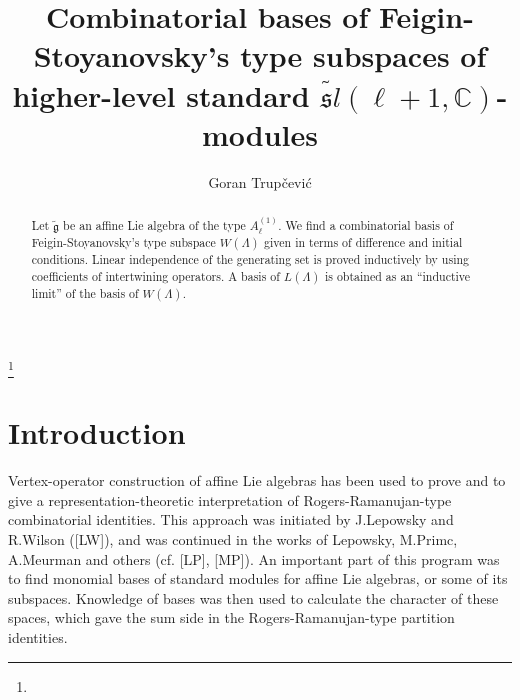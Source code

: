 \documentclass[a4paper, 10pt,oneside]{amsart}
\begin{document}
\author{Goran Trup\v{c}evi\'{c}}
\title{Combinatorial bases of Feigin-Stoyanovsky's type subspaces of higher-level standard $\tilde{{\mathfrak sl}}(\ell+1,{{\mathbb C}})$-modules}
\address{Department of Mathematics, University of Zagreb, Bijeni\v cka 30, Zagreb, Croatia}
\curraddr{}
\thanks{}
\keywords{}
\date{}
\dedicatory{}

\begin{abstract}

Let $\tilde{\mathfrak g}$ be an affine Lie algebra of the type
$A_\ell^{(1)}$.
We find a combinatorial basis of Feigin-Stoyanovsky's type subspace $W(\Lambda)$ given
in terms of difference and initial conditions. Linear
independence of the generating set is proved  inductively by using
coefficients of intertwining operators. A basis of $L(\Lambda)$ is obtained as an ``inductive limit'' of the basis of $W(\Lambda)$.
\end{abstract}

\maketitle

\section{Introduction}

Vertex-operator construction of affine Lie algebras has been used
to prove and to give a representation-theoretic interpretation of
Rogers-Ramanujan-type combinatorial identities. This approach was
initiated by J.Lepowsky and R.Wilson ([LW]), and was continued in
the works of Lepowsky, M.Primc, A.Meurman and others (cf. [LP],
[MP]). An important part of this program  was to find monomial
bases of standard modules for affine Lie algebras, or some of its
subspaces. Knowledge of bases was then used to calculate the
character of these spaces, which gave the sum side in the
Rogers-Ramanujan-type partition identities.
\end{document}
